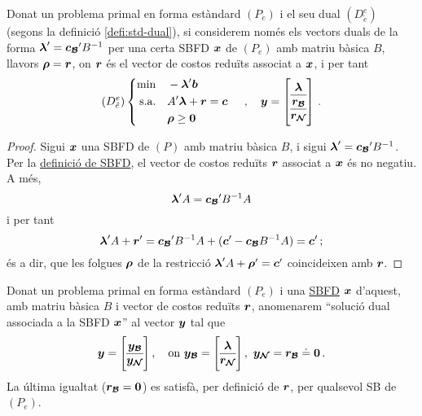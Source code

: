 \begin{prop}\label{prop:equiv-rho-r}
	Donat un problema primal en forma estàndard $(P_e)$ i el seu dual $(D^e_{\tilde{e}})$ (segons la definició \ref{defi:std-dual}), si considerem només els vectors duals de la forma $\boldsymbol{\lambda}'=\boldsymbol{c_{\mathcal{B}}}'B^{-1}$ per una certa SBFD  $\boldsymbol{x}$ de $(P_e)$ amb matriu bàsica $B$, llavors $\boldsymbol{\rho} = \boldsymbol{r}$, on $\boldsymbol{r}$ és el vector de costos reduïts associat a $\boldsymbol{x}$, i per tant
	\[
		(D^e_{\tilde{e}})
		\begin{cases}
		\begin{aligned}
			\min 			&&& -\vb{\lambda}'\vb{b}\\
			\text{s.a.}		&&& A'\vb{\lambda} +  \vb{r} = \vb{c}\\
			&&& \vb{\rho} \ge \vb{0}
		\end{aligned}
		\end{cases}\,, 
		\quad \vb{y} =
		\left[
		\begin{array}{@{}c@{}}
			\vb{\lambda}\\
			\hline
			\vb{r_\B}\\
			\hline
			\vb{r_\N}
		\end{array}
		\right]\,.
	\]
	
	\begin{proof}
		Sigui $\boldsymbol{x}$ una SBFD de $(P)$ amb matriu bàsica $B$, i sigui $\boldsymbol{\lambda}' = \boldsymbol{c_{\mathcal{B}}}'B^{-1}$. Per la \hyperref[defi:SBFD]{definició de SBFD}, el vector de costos reduïts $\boldsymbol{r}$ associat a $\boldsymbol{x}$ és no negatiu. A més,
		\[
			\boldsymbol{\lambda}'A = \boldsymbol{c_{\mathcal{B}}}'B^{-1}A
		\] 
		i per tant
		\[
			\boldsymbol{\lambda}'A + \boldsymbol{r}' = \boldsymbol{c_{\mathcal{B}}}'B^{-1}A + (\boldsymbol{c}' - \boldsymbol{c_{\mathcal{B}}}B^{-1}A) = \boldsymbol{c}'\,;
		\]
		és a dir, que les folgues $\boldsymbol{\rho}$ de la restricció $\boldsymbol{\lambda}'A +  \boldsymbol{\rho}' = \boldsymbol{c}'$ coincideixen amb $\boldsymbol{r}$.
	\end{proof}
\end{prop}

\begin{defi}
	Donat un problema primal en forma estàndard $(P_e)$ i una \hyperref[defi:SBFD]{SBFD} $\boldsymbol{x}$ d'aquest, amb matriu bàsica $B$ i vector de costos reduïts $\boldsymbol{r}$, anomenarem ``solució dual associada a la SBFD $\boldsymbol{x}$'' al vector $\boldsymbol{y}$ tal que
	\[
		\vb{y} = 
		\left[\begin{array}{@{}c@{}}
		\vb{y_\B}\\
		\hline
		\vb{y_\N}
		\end{array}\right],\quad\text{on }
		\vb{y_\B}=
		\left[\begin{array}{@{}c@{}}
			\vb{\lambda}\\
			\hline
			\vb{r_\N}
		\end{array}\right],\ 
		\vb{y_\N} = \vb{r_\B} \doteq \vb{0}\,.	
	\]
	La última igualtat ($\boldsymbol{r_{\mathcal{B}}}=\boldsymbol{0}$) es satisfà, per definició de $\boldsymbol{r}$, per qualsevol SB de $(P_e)$.
\end{defi}

